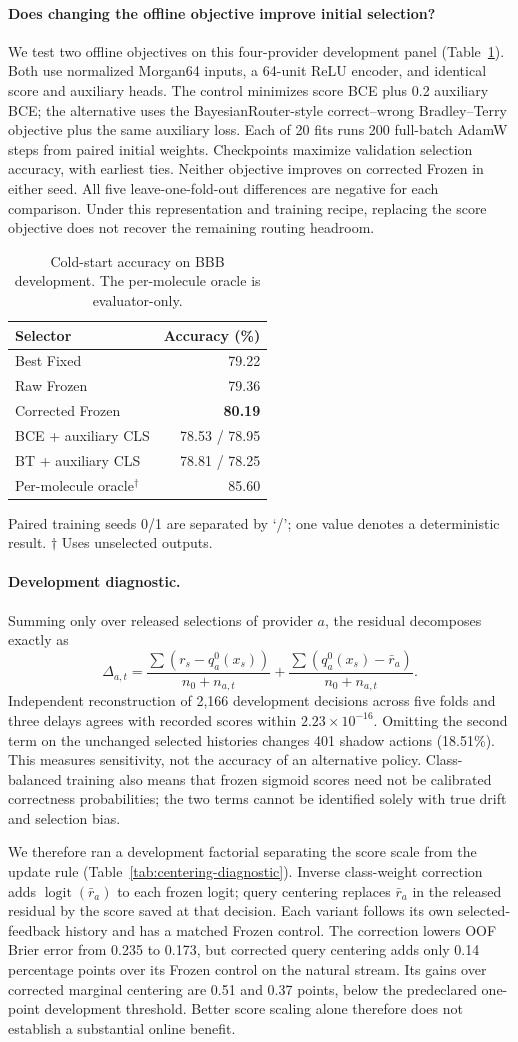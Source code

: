 \documentclass[sigconf,anonymous]{aamas}
\makeatletter
\newcommand{\MiraTableFont}{\fontsize{9}{11}\selectfont}
\newcommand{\tnote}[1]{{\fontsize{8.5}{10}\selectfont\raggedright\par\vspace{3pt}#1\par}}
\newcommand{\MiraPriorCaption}{Cold-start accuracy on BBB development. The per-molecule oracle is evaluator-only.}
\newcommand{\MiraPriorLabels}{\label{tab:learned-prior}}
\newcommand{\MiraPriorBody}{%
\begingroup\centering\MiraTableFont\setlength{\tabcolsep}{9pt}\renewcommand{\arraystretch}{1.08}
\begin{tabular}{@{}lr@{}}
\toprule
Selector & Accuracy (\%) \\
\midrule
Best Fixed & 79.22 \\
Raw Frozen & 79.36 \\
Corrected Frozen & \textbf{80.19} \\
\midrule
BCE + auxiliary CLS & 78.53 / 78.95 \\
BT + auxiliary CLS & 78.81 / 78.25 \\
\midrule
Per-molecule oracle$^{\dagger}$ & 85.60 \\
\bottomrule
\end{tabular}\par
\tnote{Paired training seeds 0/1 are separated by `/'; one value denotes a deterministic result. $\dagger$ Uses unselected outputs.}
\endgroup}
\makeatother
\begin{document}
\paragraph{Does changing the offline objective improve initial selection?}
We test two offline objectives on this four-provider development panel (Table~\ref{tab:learned-prior}). Both use normalized Morgan64 inputs, a 64-unit ReLU encoder, and identical score and auxiliary heads. The control minimizes score BCE plus 0.2 auxiliary BCE; the alternative uses the BayesianRouter-style correct--wrong Bradley--Terry objective plus the same auxiliary loss. Each of 20 fits runs 200 full-batch AdamW steps from paired initial weights. Checkpoints maximize validation selection accuracy, with earliest ties. Neither objective improves on corrected Frozen in either seed. All five leave-one-fold-out differences are negative for each comparison. Under this representation and training recipe, replacing the score objective does not recover the remaining routing headroom.

\begin{table}[t]
\caption{\MiraPriorCaption}
\MiraPriorLabels
\MiraPriorBody
\end{table}


\paragraph{Development diagnostic.}
Summing only over released selections of provider $a$, the residual decomposes exactly as
\begin{equation}
\Delta_{a,t}=\frac{\sum(r_s-q_a^0(x_s))}{n_0+n_{a,t}}
            +\frac{\sum(q_a^0(x_s)-\bar r_a)}{n_0+n_{a,t}}.
\end{equation}
Independent reconstruction of 2,166 development decisions across five folds and three delays agrees with recorded scores within $2.23\times10^{-16}$. Omitting the second term on the unchanged selected histories changes 401 shadow actions (18.51\%). This measures sensitivity, not the accuracy of an alternative policy. Class-balanced training also means that frozen sigmoid scores need not be calibrated correctness probabilities; the two terms cannot be identified solely with true drift and selection bias.

We therefore ran a development factorial separating the score scale from the update rule (Table~\ref{tab:centering-diagnostic}). Inverse class-weight correction adds $\operatorname{logit}(\bar r_a)$ to each frozen logit; query centering replaces $\bar r_a$ in the released residual by the score saved at that decision. Each variant follows its own selected-feedback history and has a matched Frozen control. The correction lowers OOF Brier error from 0.235 to 0.173, but corrected query centering adds only 0.14 percentage points over its Frozen control on the natural stream. Its gains over corrected marginal centering are 0.51 and 0.37 points, below the predeclared one-point development threshold. Better score scaling alone therefore does not establish a substantial online benefit.
\end{document}
